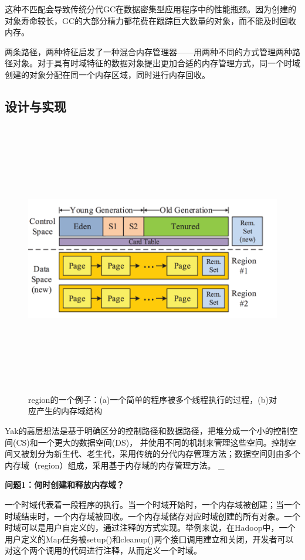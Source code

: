 这种不匹配会导致传统分代GC在数据密集型应用程序中的性能瓶颈。因为创建的对象寿命较长，GC的大部分精力都花费在跟踪巨大数量的对象，而不能及时回收内存。 

两条路径，两种特征启发了一种混合内存管理器——用两种不同的方式管理两种路径对象。对于具有时域特征的数据对象提出更加合适的内存管理方式，同一个时域创建的对象分配在同一个内存区域，同时进行内存回收。

\subsection{设计与实现}
\begin{figure}[h]
    \centering
    \includegraphics[width=12cm,height=12cm]{figure/layout.png}
    \caption{
        region的一个例子：(a)一个简单的程序被多个线程执行的过程，(b)对应产生的内存域结构
    }
    \label{img3}
\end{figure}
Yak的高层想法是基于明确区分的控制路径和数据路径，把堆分成一个小的控制空间(CS)和一个更大的数据空间(DS)， 并使用不同的机制来管理这些空间。控制空间又被划分为新生代、老生代，采用传统的分代内存管理方法；数据空间则由多个内存域（region）组成，采用基于内存域的内存管理方法。
_

{\bfseries 问题1：何时创建和释放内存域？}

一个时域代表着一段程序的执行。当一个时域开始时，一个内存域被创建；当一个时域结束时，一个内存域被回收。一个内存域储存对应时域创建的所有对象。一个时域可以是用户自定义的，通过注释的方式实现。举例来说，在Hadoop中，一个用户定义的Map任务被setup()和cleanup()两个接口调用建立和关闭，开发者可以对这个两个调用的代码进行注释，从而定义一个时域。

